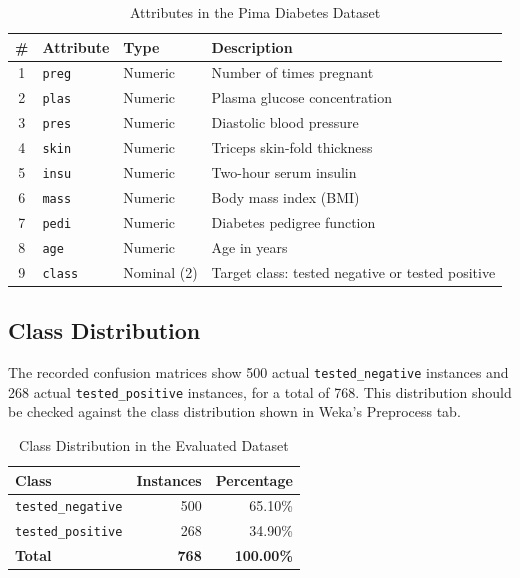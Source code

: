 \documentclass[11pt,a4paper]{article}
\begin{document}
\begin{table}[H]
\centering
\footnotesize
\caption{Attributes in the Pima Diabetes Dataset}
\label{tab:attributes}
\begin{tabularx}{\textwidth}{cllX}
\toprule
\textbf{\#} & \textbf{Attribute} & \textbf{Type} & \textbf{Description} \\
\midrule
1 & \texttt{preg} & Numeric & Number of times pregnant \\
2 & \texttt{plas} & Numeric & Plasma glucose concentration \\
3 & \texttt{pres} & Numeric & Diastolic blood pressure \\
4 & \texttt{skin} & Numeric & Triceps skin-fold thickness \\
5 & \texttt{insu} & Numeric & Two-hour serum insulin \\
6 & \texttt{mass} & Numeric & Body mass index (BMI) \\
7 & \texttt{pedi} & Numeric & Diabetes pedigree function \\
8 & \texttt{age} & Numeric & Age in years \\
9 & \texttt{class} & Nominal (2) & Target class: tested negative or tested positive \\
\bottomrule
\end{tabularx}
\end{table}

\subsection{Class Distribution}
The recorded confusion matrices show 500 actual \texttt{tested\_negative} instances and 268 actual \texttt{tested\_positive} instances, for a total of 768. This distribution should be checked against the class distribution shown in Weka's Preprocess tab.

\begin{table}[H]
\centering
\small
\caption{Class Distribution in the Evaluated Dataset}
\label{tab:classdist}
\begin{tabular}{lrr}
\toprule
\textbf{Class} & \textbf{Instances} & \textbf{Percentage} \\
\midrule
\texttt{tested\_negative} & 500 & 65.10\% \\
\texttt{tested\_positive} & 268 & 34.90\% \\
\midrule
\textbf{Total} & \textbf{768} & \textbf{100.00\%} \\
\bottomrule
\end{tabular}
\end{table}
\end{document}
